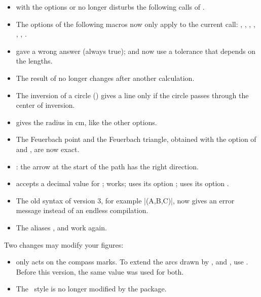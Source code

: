 \begin{itemize}
  \item {} with the options  or  no longer disturbs the following calls of .
  \item The options of the following macros now only apply to the current call: , , , , , , .
  \item {} gave a wrong answer (always true);  and  now use a tolerance that depends on the lengths.
  \item The result of  no longer changes after another calculation.
  \item The inversion of a circle () gives a line only if the circle passes through the center of inversion.
  \item {}\code{[spieker]} gives the radius in cm, like the other options.
  \item The Feuerbach point and the Feuerbach triangle, obtained with the option  of  and , are now exact.
  \item {}: the arrow at the start of the path has the right direction.
  \item {} accepts a decimal value for ; \code{[return]} works;  uses its option ;  uses its option .
  \item The old syntax of version 3, for example |\tkzDrawCircle[euler](A,B,C)|, now gives an error message instead of an endless compilation.
  \item The aliases ,  and  work again.
\end{itemize}

Two changes may modify your figures:
\begin{itemize}
  \item {}\code{[delta=...]} only acts on the compass marks. To extend the arcs drawn by ,  and , use \code{[delta=...]}. Before this version, the same value was used for both.
  \item The \TIKZ\ style  is no longer modified by the package.
\end{itemize}

